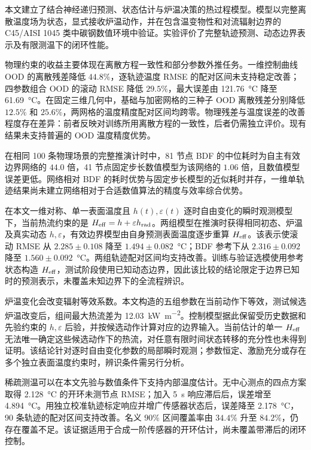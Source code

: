 

本文建立了结合神经递归预测、状态估计与炉温决策的热过程模型。模型以完整离散温度场为状态，显式接收炉温动作，并在包含温变物性和对流辐射边界的 C45/AISI 1045 类中碳钢数值环境中验证。实验评价了完整轨迹预测、动态边界表示及有限测温下的闭环性能。


物理约束的收益主要体现在离散方程一致性和部分参数外推任务。一维控制曲线 OOD 的离散残差降低 $44.8\%$，逐轨迹温度 RMSE 的配对区间未支持稳定改善；四参数组合 OOD 的滚动 RMSE 降低 $29.5\%$，最大误差由 \SI{121.76}{\degreeCelsius} 降至 \SI{61.69}{\degreeCelsius}。在固定三维几何中，基础与加密网格的三种子 OOD 离散残差分别降低 $12.5\%$ 和 $25.6\%$，两网格的温度精度配对区间均跨零。物理残差与温度误差的改善程度存在差异：前者反映对训练所用离散方程的一致性，后者仍需独立评价。现有结果未支持普遍的 OOD 温度精度优势。

在相同 100 条物理场景的完整推演计时中，81 节点 BDF 的中位耗时为自主有效边界网络的 $44.0$ 倍，41 节点固定步长数值模型为该网络的 $1.06$ 倍，且数值模型误差更低。网络相对 BDF 的耗时优势与固定步长模型的近似耗时并存，一维单轨迹结果尚未建立网络相对于合适数值算法的精度与效率综合优势。


在本文一维对称、单一表面温度且 $h(t),\varepsilon(t)$ 逐时自由变化的瞬时观测模型下，当前热流约束的是 ${H_{\mathrm{eff}}}=h+\varepsilon h_{\mathrm{rad}}$。两组模型在推演时获得相同初态、炉温及真实动态 $h,\varepsilon$，有效边界模型由自身预测表面温度逐步重算 ${H_{\mathrm{eff}}}$。该表示使滚动 RMSE 从 $2.285\pm0.108$ 降至 $1.494\pm0.082$~\si{\degreeCelsius}；BDF 参考下从 $2.316\pm0.092$ 降至 $1.560\pm0.092$~\si{\degreeCelsius}。两组轨迹配对区间均支持改善。训练与验证选模使用参考状态构造 ${H_{\mathrm{eff}}}$，测试阶段使用已知动态边界，因此该比较的结论限定于边界已知时的预测表示，未覆盖未知边界下的全流程辨识。

炉温变化会改变辐射等效系数。本文构造的五组参数在当前动作下等效，测试候选炉温改变后，组间最大热流差为 \SI{12.03}{\kilo\watt\per\square\metre}。控制模型据此保留受历史数据和先验约束的 $h,\varepsilon$ 后验，并按候选动作计算对应的边界输入。当前估计的单一 ${H_{\mathrm{eff}}}$ 无法唯一确定这些候选动作下的热流，对任意有限时间状态转移的充分性也未得到证明。该结论针对逐时自由变化参数的局部瞬时观测；参数恒定、激励充分或存在多个独立表面温度约束时，辨识条件需另行分析。


稀疏测温可以在本文先验与数值条件下支持内部温度估计。无中心测点的四点方案取得 \SI{2.128}{\degreeCelsius} 的开环未测节点 RMSE；加入 \SI{5}{\second} 响应滞后后，误差增至 \SI{4.894}{\degreeCelsius}。用独立校准轨迹标定响应并增广传感器状态后，误差降至 \SI{2.178}{\degreeCelsius}，90 条轨迹的配对区间支持改善。名义 $90\%$ 区间覆盖率由 $34.4\%$ 升至 $84.2\%$，仍存在覆盖不足。该证据适用于合成一阶传感器的开环估计，尚未覆盖带滞后的闭环控制。

